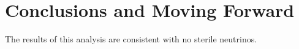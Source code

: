 \chapter{Conclusions and Moving Forward}
\label{conclusion}

The results of this analysis are consistent with no sterile neutrinos.